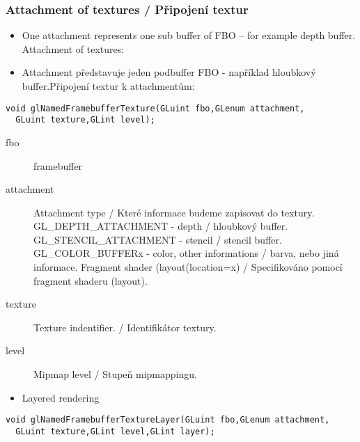 \begin{frame}[fragile]\frametitle{Attachment of textures / Připojení textur}\scriptsize
\begin{itemize}
  \item One attachment represents one sub buffer of FBO -- for example depth buffer. Attachment of textures:
  \item Attachment představuje jeden podbuffer FBO - například hloubkový buffer.Připojení textur k attachmentům:
\end{itemize}

\begin{verbatim}
void glNamedFramebufferTexture(GLuint fbo,GLenum attachment,
  GLuint texture,GLint level);
\end{verbatim}

\begin{description}
\item[fbo] framebuffer
\item[attachment] Attachment type / Které informace budeme zapisovat do textury.
GL\_DEPTH\_ATTACHMENT - depth / hloubkový buffer.
GL\_STENCIL\_ATTACHMENT - stencil / stencil buffer.
GL\_COLOR\_BUFFERx - color, other informations / barva, nebo jiná informace.
    Fragment shader (layout(location=x) / Specifikováno pomocí fragment shaderu (layout).
\item[texture] Texture indentifier. / Identifikátor textury.
\item[level] Mipmap level / Stupeň mipmappingu.

\end{description}

\begin{itemize}
  \item Layered rendering
\end{itemize}

\begin{verbatim}
void glNamedFramebufferTextureLayer(GLuint fbo,GLenum attachment,
  GLuint texture,GLint level,GLint layer);
\end{verbatim}

\end{frame}

